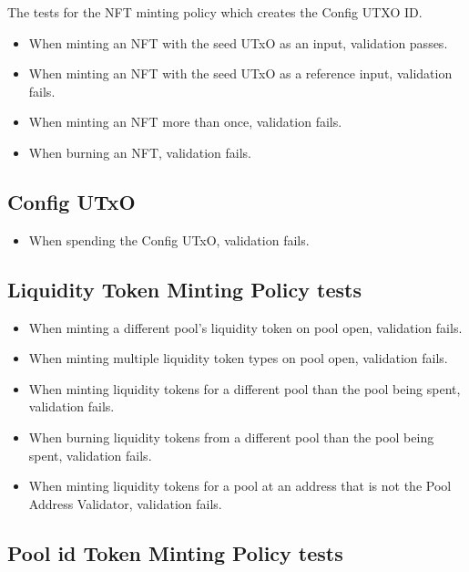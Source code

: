 \documentclass{article}
\begin{document}
The tests for the NFT minting policy which creates the Config UTXO ID.
\begin{itemize}
	\item When minting an NFT with the seed UTxO as an input, validation passes.
	\item When minting an NFT with the seed UTxO as a reference input, validation fails.
	\item When minting an NFT more than once, validation fails.
	\item When burning an NFT, validation fails.
\end{itemize}

\subsection*{Config UTxO}

\begin{itemize}
	\item When spending the Config UTxO, validation fails.
\end{itemize}

\subsection*{Liquidity Token Minting Policy tests}

\begin{itemize}
	\item When minting a different pool's liquidity token on pool open, validation fails.
	\item When minting multiple liquidity token types on pool open, validation fails.
	\item When minting liquidity tokens for a different pool than the pool being spent, validation fails.
	\item When burning liquidity tokens from a different pool than the pool being spent, validation fails.
	\item When minting liquidity tokens for a pool at an address that is not the Pool Address Validator, validation fails.
\end{itemize}

\subsection*{Pool id Token Minting Policy tests}
\end{document}
